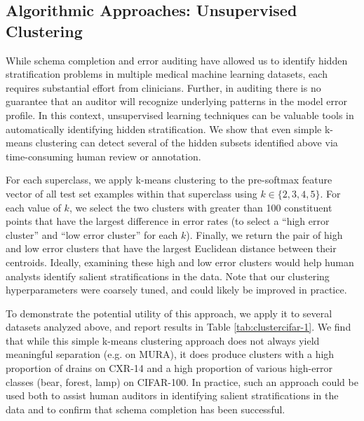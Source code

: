 \documentclass[sigconf]{acmart}
\begin{document}
\subsection{Algorithmic Approaches: Unsupervised Clustering}

While schema completion and error auditing have allowed us to identify hidden stratification problems in multiple medical machine learning datasets, each requires substantial effort from clinicians.
Further, in auditing there is no guarantee that an auditor will recognize underlying patterns in the model error profile.
In this context, unsupervised learning techniques can be valuable tools in automatically identifying hidden stratification.
We show that even simple k-means clustering can detect several of the hidden subsets identified above via time-consuming human review or annotation.

For each superclass, we apply k-means clustering to the pre-softmax feature vector of all test set examples within that superclass using $k \in \{2,3,4,5\}$.
For each value of $k$, we select the two clusters with greater than 100 constituent points that have the largest difference in error rates (to select a ``high error cluster'' and ``low error cluster'' for each $k$).
Finally, we return the pair of high and low error clusters that have the largest Euclidean distance between their centroids.
Ideally, examining these high and low error clusters would help human analysts identify salient stratifications in the data.
Note that our clustering hyperparameters were coarsely tuned, and could likely be improved in practice.

To demonstrate the potential utility of this approach, we apply it to several datasets analyzed above, and report results in Table \ref{tab:clustercifar-1}.  
We find that while this simple k-means clustering approach does not always yield meaningful separation (e.g. on MURA), it does produce clusters with a high proportion of drains on CXR-14 and a high proportion of various high-error classes (bear, forest, lamp) on CIFAR-100.  
 In practice, such an approach could be used both to assist human auditors in identifying salient stratifications in the data and to confirm that schema completion has been successful.
\end{document}
